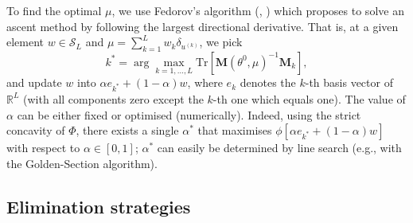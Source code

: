 \documentclass[a4paper]{article}
\newcommand{\Luc}{\color{magenta} }
\theoremstyle{definition}
\theoremstyle{remark}
\newcommand{\R}{\mathbb{R}}
\newcommand{\Tr}{\mathrm{Tr}}
\newcommand{\Mb}{\mathbf{M}}
\renewcommand{\S}{\mathcal{S}}
\begin{document}
To find the optimal $\mu$, we use Fedorov's algorithm (\cite{Fedorov70}, \cite[Sect.~5.2]{Fedorov72}) which proposes to solve an ascent method by following the largest directional derivative. That is, at a given element $w\in \S_L$ and $\mu = \sum_{k=1}^L w_k\delta_{u^{(k)}}$, we pick
\begin{equation}\label{k*}
k^*=\arg\max_{k=1,\dots, L}  \Tr
\left[
\Mb(\theta^0,\mu)^{-1}
\Mb_k
\right],
\end{equation}
and update $w$ into $\alpha e_{k^*}+(1-\alpha)w$, 
{\Luc where $e_k$ denotes the $k$-th basis vector of $\R^L$ (with all components zero except the $k$-th one which equals one).}
{\Luc The value of $\alpha$ can be either fixed or optimised (numerically). Indeed, using the strict concavity of $\Phi$, there exists a single $\alpha^*$ that maximises $\phi[\alpha e_{k^*}+(1-\alpha)w]$ with respect to $\alpha\in[0,1]$; $\alpha^*$ can easily be determined by line search (e.g., with the Golden-Section algorithm).}  

\subsection{Elimination strategies}\label{S:elimination}
\end{document}
